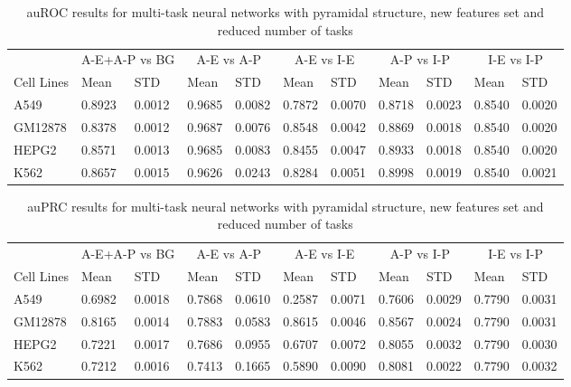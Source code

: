\begin{table}[!htbp]
\centering
\caption{auROC results for multi-task neural networks with pyramidal structure, new features set and reduced number of tasks}
\label{tab:new_4celllines_auroc}
\hspace*{-2.2cm}
\begin{tabular}[t]{*{11}{l}}
\toprule
 & \multicolumn{2}{c}{A-E+A-P vs BG} & \multicolumn{2}{c}{A-E vs A-P} & \multicolumn{2}{c}{A-E vs I-E} & \multicolumn{2}{c}{A-P vs I-P} & \multicolumn{2}{c}{I-E vs I-P} \\
\cmidrule(lr){2-3}
\cmidrule(lr){4-5}
\cmidrule(lr){6-7}
\cmidrule(lr){8-9}
\cmidrule(lr){10-11}
Cell Lines & Mean & STD & Mean & STD & Mean & STD & Mean & STD & Mean & STD \\
\midrule
A549  & 0.8923 & 0.0012 & 0.9685 & 0.0082 & 0.7872 & 0.0070 & 0.8718 & 0.0023 & 0.8540 & 0.0020\\
GM12878  & 0.8378 & 0.0012 & 0.9687 & 0.0076 & 0.8548 & 0.0042 & 0.8869 & 0.0018 & 0.8540 & 0.0020\\
HEPG2  & 0.8571 & 0.0013 & 0.9685 & 0.0083 & 0.8455 & 0.0047 & 0.8933 & 0.0018 & 0.8540 & 0.0020\\
K562  & 0.8657 & 0.0015 & 0.9626 & 0.0243 & 0.8284 & 0.0051 & 0.8998 & 0.0019 & 0.8540 & 0.0021\\
\bottomrule
\end{tabular}
\hspace*{-2.2cm}
\end{table}
\begin{table}[!htbp]
\centering
\caption{auPRC results for multi-task neural networks with pyramidal structure, new features set and reduced number of tasks}
\label{tab:new_4celllines__auprc}
\hspace*{-2.2cm}
\begin{tabular}[t]{*{11}{l}}
\toprule
 & \multicolumn{2}{c}{A-E+A-P vs BG} & \multicolumn{2}{c}{A-E vs A-P} & \multicolumn{2}{c}{A-E vs I-E} & \multicolumn{2}{c}{A-P vs I-P} & \multicolumn{2}{c}{I-E vs I-P} \\
\cmidrule(lr){2-3}
\cmidrule(lr){4-5}
\cmidrule(lr){6-7}
\cmidrule(lr){8-9}
\cmidrule(lr){10-11}
Cell Lines & Mean & STD & Mean & STD & Mean & STD & Mean & STD & Mean & STD \\
\midrule
A549  & 0.6982 & 0.0018 & 0.7868 & 0.0610 & 0.2587 & 0.0071 & 0.7606 & 0.0029 & 0.7790 & 0.0031\\
GM12878  & 0.8165 & 0.0014 & 0.7883 & 0.0583 & 0.8615 & 0.0046 & 0.8567 & 0.0024 & 0.7790 & 0.0031\\
HEPG2  & 0.7221 & 0.0017 & 0.7686 & 0.0955 & 0.6707 & 0.0072 & 0.8055 & 0.0032 & 0.7790 & 0.0030\\
K562  & 0.7212 & 0.0016 & 0.7413 & 0.1665 & 0.5890 & 0.0090 & 0.8081 & 0.0022 & 0.7790 & 0.0032\\
\bottomrule
\end{tabular}
\hspace*{-2.2cm}
\end{table}